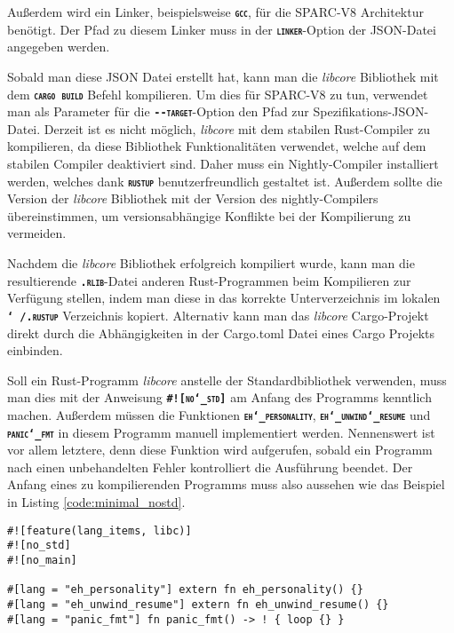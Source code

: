Außerdem wird ein Linker, beispielsweise \texttt{\textsc{\textbf{gcc}}},
für die SPARC-V8 Architektur benötigt. Der Pfad zu diesem Linker
muss in der \texttt{\textsc{\textbf{linker}}}-Option der JSON-Datei angegeben werden.

Sobald man diese JSON Datei erstellt hat, kann man die \textit{libcore} Bibliothek mit dem
\texttt{\textsc{\textbf{cargo build}}} Befehl kompilieren.
Um dies für SPARC-V8 zu tun, verwendet man als Parameter für die \texttt{\textsc{\textbf{-{}-target}}}-Option
den Pfad zur Spezifikations-JSON-Datei.
Derzeit ist es nicht möglich, \textit{libcore} mit dem stabilen Rust-Compiler zu kompilieren,
da diese Bibliothek Funktionalitäten verwendet, welche auf dem stabilen Compiler deaktiviert sind.
Daher muss ein Nightly-Compiler installiert werden, welches
dank \texttt{\textsc{\textbf{rustup}}} benutzerfreundlich gestaltet ist.
Außerdem sollte die Version der \textit{libcore} Bibliothek
mit der Version des nightly-Compilers übereinstimmen,
um versionsabhängige Konflikte bei der Kompilierung zu vermeiden.

Nachdem die \textit{libcore} Bibliothek erfolgreich kompiliert wurde, kann man
die resultierende \texttt{\textsc{\textbf{.rlib}}}-Datei anderen Rust-Programmen
beim Kompilieren zur Verfügung stellen, indem man diese in das korrekte Unterverzeichnis im
lokalen \texttt{\textsc{\textbf{\char`~/.rustup}}} Verzeichnis kopiert.
Alternativ kann man das \textit{libcore} Cargo-Projekt direkt durch die Abhängigkeiten in der Cargo.toml Datei
eines Cargo Projekts einbinden.

Soll ein Rust-Programm \textit{libcore} anstelle der Standardbibliothek verwenden, muss man dies
mit der Anweisung \texttt{\textsc{\textbf{\#![no\char`_std]}}}
am Anfang des Programms kenntlich machen.
Außerdem müssen die Funktionen \texttt{\textsc{\textbf{eh\char`_personality}}},
\texttt{\textsc{\textbf{eh\char`_unwind\char`_resume}}} und
\texttt{\textsc{\textbf{panic\char`_fmt}}} in diesem Programm manuell implementiert werden.
Nennenswert ist vor allem letztere, denn diese Funktion
wird aufgerufen, sobald ein Programm nach einen unbehandelten Fehler kontrolliert die Ausführung beendet.
Der Anfang eines zu kompilierenden Programms muss also aussehen wie das Beispiel in Listing \ref{code:minimal_nostd}.

\begin{lstlisting}[float,caption={
Der Beginn eines Rust-Programms, welches nicht die Standardbibliothek verwendet.
},label=code:minimal_nostd]
#![feature(lang_items, libc)]
#![no_std]
#![no_main]

#[lang = "eh_personality"] extern fn eh_personality() {}
#[lang = "eh_unwind_resume"] extern fn eh_unwind_resume() {}
#[lang = "panic_fmt"] fn panic_fmt() -> ! { loop {} }
\end{lstlisting}

